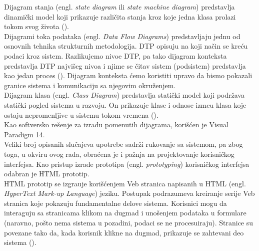 Dijagram stanja (engl. \textit{state diagram} ili \textit{state machine diagram}) predstavlja dinami\v cki model koji prikazuje razli\v cita stanja kroz koje jedna klasa prolazi tokom svog \v zivota (\cite{SAAD}).\\

Dijagrami toka podataka (engl. \textit{Data Flow Diagrams}) predstavljaju jednu od osnovnih tehnika strukturnih metodologija. DTP opisuju na koji na\v cin se kre\' cu podaci kroz sistem. Razlikujemo nivoe DTP, pa tako dijagram konteksta predstavlja DTP najvi\v seg nivoa i njime se \v citav sistem (podsistem) predstavlja kao jedan proces (\cite{smalkov-slajdovi}). Dijagram konteksta \' cemo koristiti upravo da bismo pokazali granice sistema i komunikaciju sa njegovim okru\v zenjem.\\

Dijagram klasa (engl. \textit{Class Diagram}) predstavlja stati\v cki model koji podr\v zava stati\v cki pogled sistema u razvoju. On prikazuje klase i odnose izme\dj u klasa koje ostaju nepromenljive u sistemu tokom vremena (\cite{SAAD}).\\

Kao softversko re\v senje za izradu pomenutih dijagrama, kori\v s\' cen je Visual Paradigm 14.\\

Veliki broj opisanih slu\v cajeva upotrebe sadr\v zi rukovanje sa sistemom, pa zbog toga, u okviru ovog rada, obra\' cena je i pa\v znja na projektovanje korisni\v ckog interfejsa. Kao pristup izrade prototipa (engl. \textit{prototyping}) korisni\v ckog interfejsa odabran je HTML prototip.\\

HTML prototip se izgra\dj uje kori\v s\'cenjem Veb stranica napisanih u HTML (engl. \textit{HyperText Mark-up Language}) jeziku. Postupak podrazumeva kreiranje serije Veb stranica koje pokazuju fundamentalne delove sistema. Korisnici mogu da interaguju sa stranicama klikom na dugmad i uno\v senjem podataka u formulare (naravno, po\v sto nema sistema u pozadini, podaci se ne procesuiraju). Stranice su povezane tako da, kada korisnik klikne na dugmad, prikazuje se zahtevani deo sistema (\cite{SAAD}).

\newpage